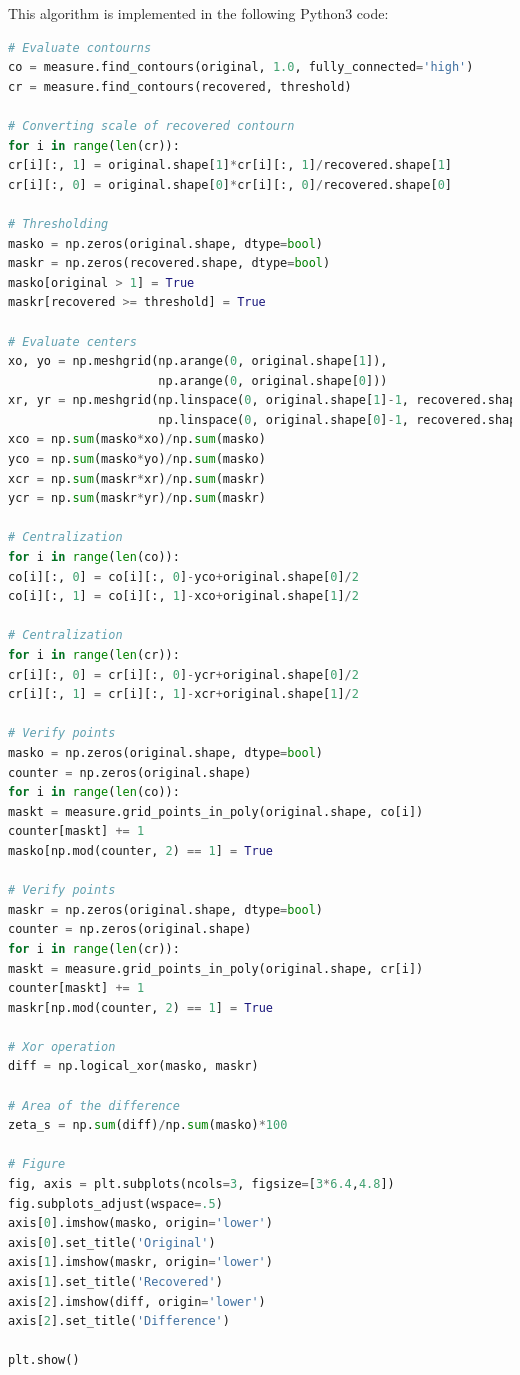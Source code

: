 		This algorithm is implemented in the following Python3 code: {\footnotesize
		\begin{lstlisting}[language=Python]
# Evaluate contourns
co = measure.find_contours(original, 1.0, fully_connected='high')
cr = measure.find_contours(recovered, threshold)

# Converting scale of recovered contourn
for i in range(len(cr)):
cr[i][:, 1] = original.shape[1]*cr[i][:, 1]/recovered.shape[1]
cr[i][:, 0] = original.shape[0]*cr[i][:, 0]/recovered.shape[0]

# Thresholding
masko = np.zeros(original.shape, dtype=bool)
maskr = np.zeros(recovered.shape, dtype=bool)
masko[original > 1] = True
maskr[recovered >= threshold] = True

# Evaluate centers
xo, yo = np.meshgrid(np.arange(0, original.shape[1]),
                     np.arange(0, original.shape[0]))
xr, yr = np.meshgrid(np.linspace(0, original.shape[1]-1, recovered.shape[1]),
                     np.linspace(0, original.shape[0]-1, recovered.shape[0]))
xco = np.sum(masko*xo)/np.sum(masko)
yco = np.sum(masko*yo)/np.sum(masko)
xcr = np.sum(maskr*xr)/np.sum(maskr)
ycr = np.sum(maskr*yr)/np.sum(maskr)

# Centralization
for i in range(len(co)):
co[i][:, 0] = co[i][:, 0]-yco+original.shape[0]/2
co[i][:, 1] = co[i][:, 1]-xco+original.shape[1]/2

# Centralization
for i in range(len(cr)):
cr[i][:, 0] = cr[i][:, 0]-ycr+original.shape[0]/2
cr[i][:, 1] = cr[i][:, 1]-xcr+original.shape[1]/2

# Verify points
masko = np.zeros(original.shape, dtype=bool)
counter = np.zeros(original.shape)
for i in range(len(co)):
maskt = measure.grid_points_in_poly(original.shape, co[i])
counter[maskt] += 1
masko[np.mod(counter, 2) == 1] = True

# Verify points
maskr = np.zeros(original.shape, dtype=bool)
counter = np.zeros(original.shape)
for i in range(len(cr)):
maskt = measure.grid_points_in_poly(original.shape, cr[i])
counter[maskt] += 1
maskr[np.mod(counter, 2) == 1] = True

# Xor operation
diff = np.logical_xor(masko, maskr)

# Area of the difference
zeta_s = np.sum(diff)/np.sum(masko)*100

# Figure
fig, axis = plt.subplots(ncols=3, figsize=[3*6.4,4.8])
fig.subplots_adjust(wspace=.5)
axis[0].imshow(masko, origin='lower')
axis[0].set_title('Original')
axis[1].imshow(maskr, origin='lower')
axis[1].set_title('Recovered')
axis[2].imshow(diff, origin='lower')
axis[2].set_title('Difference')

plt.show()
		\end{lstlisting}}
		
